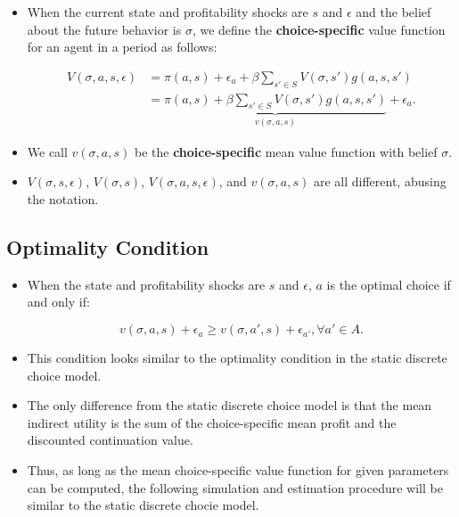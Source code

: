 \documentclass[]{book}
\providecommand{\tightlist}{%
  \setlength{\itemsep}{0pt}\setlength{\parskip}{0pt}}
\begin{document}
\begin{itemize}
\tightlist
\item
  When the current state and profitability shocks are \(s\) and
  \(\epsilon\) and the belief about the future behavior is \(\sigma\),
  we define the \textbf{choice-specific} value function for an agent in
  a period as follows:

  \begin{equation}
  \begin{split}
  V(\sigma, a, s, \epsilon) &= \pi(a , s) + \epsilon_a + \beta \sum_{s' \in S} V(\sigma, s') g(a, s, s')\\
   &= \underbrace{\pi(a , s) + \beta \sum_{s' \in S} V(\sigma, s') g(a, s, s')}_{v(\sigma, a, s)} + \epsilon_a.
  \end{split}
  \end{equation}
\item
  We call \(v(\sigma, a, s)\) be the \textbf{choice-specific} mean value
  function with belief \(\sigma\).
\item
  \(V(\sigma, s, \epsilon)\), \(V(\sigma, s)\),
  \(V(\sigma, a, s, \epsilon)\), and \(v(\sigma, a, s)\) are all
  different, abusing the notation.
\end{itemize}

\subsection{Optimality Condition}\label{optimality-condition}

\begin{itemize}
\tightlist
\item
  When the state and profitability shocks are \(s\) and \(\epsilon\),
  \(a\) is the optimal choice if and only if:

  \begin{equation}
  v(\sigma, a, s) + \epsilon_{a} \ge v(\sigma, a', s) + \epsilon_{a'}, \forall a' \in A.
  \end{equation}
\item
  This condition looks similar to the optimality condition in the static
  discrete choice model.
\item
  The only difference from the static discrete choice model is that the
  mean indirect utility is the sum of the choice-specific mean profit
  and the discounted continuation value.
\item
  Thus, as long as the mean choice-specific value function for given
  parameters can be computed, the following simulation and estimation
  procedure will be similar to the static discrete chocie model.
\end{itemize}
\end{document}
